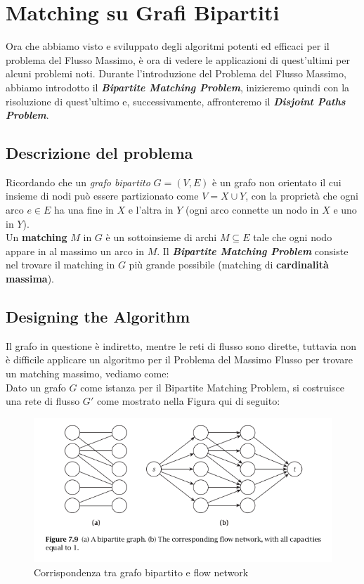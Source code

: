 \chapter{Matching su Grafi Bipartiti}

Ora che abbiamo visto e sviluppato degli algoritmi potenti ed efficaci
per il problema del Flusso Massimo, è ora di vedere le applicazioni di
quest'ultimi per alcuni problemi noti. Durante l'introduzione del
Problema del Flusso Massimo, abbiamo introdotto il
\textbf{\emph{Bipartite Matching Problem}}, inizieremo quindi con la
risoluzione di quest'ultimo e, successivamente, affronteremo il
\textbf{\emph{Disjoint Paths Problem}}.

\section{Descrizione del problema}

Ricordando che un \emph{grafo bipartito} $G = (V, E)$ è un grafo non
orientato il cui insieme di nodi può essere partizionato come
$V = X \cup Y$, con la proprietà che ogni arco $e \in E$ ha una fine
in $X$ e l'altra in $Y$ (ogni arco connette un nodo in $X$ e uno
in $Y$).\\ Un \textbf{matching} $M$ in $G$ è un sottoinsieme di
archi $M \subseteq E$ tale che ogni nodo appare in al massimo un arco
in $M$. Il \textbf{\emph{Bipartite Matching Problem}} consiste nel
trovare il matching in $G$ più grande possibile (matching di
\textbf{cardinalità massima}).

\section{Designing the Algorithm}

Il grafo in questione è indiretto, mentre le reti di flusso sono
dirette, tuttavia non è difficile applicare un algoritmo per il Problema
del Massimo Flusso per trovare un matching massimo, vediamo come:\\

Dato un grafo $G$ come istanza per il Bipartite Matching Problem, si
costruisce una rete di flusso $G'$ come mostrato nella Figura qui di
seguito:\\

\begin{figure}[H]
    \centering
    \includegraphics[width = 12cm]{Network_flow/imgs/bipartite1.png}
    \caption{Corrispondenza tra grafo bipartito e flow network}
\end{figure}

